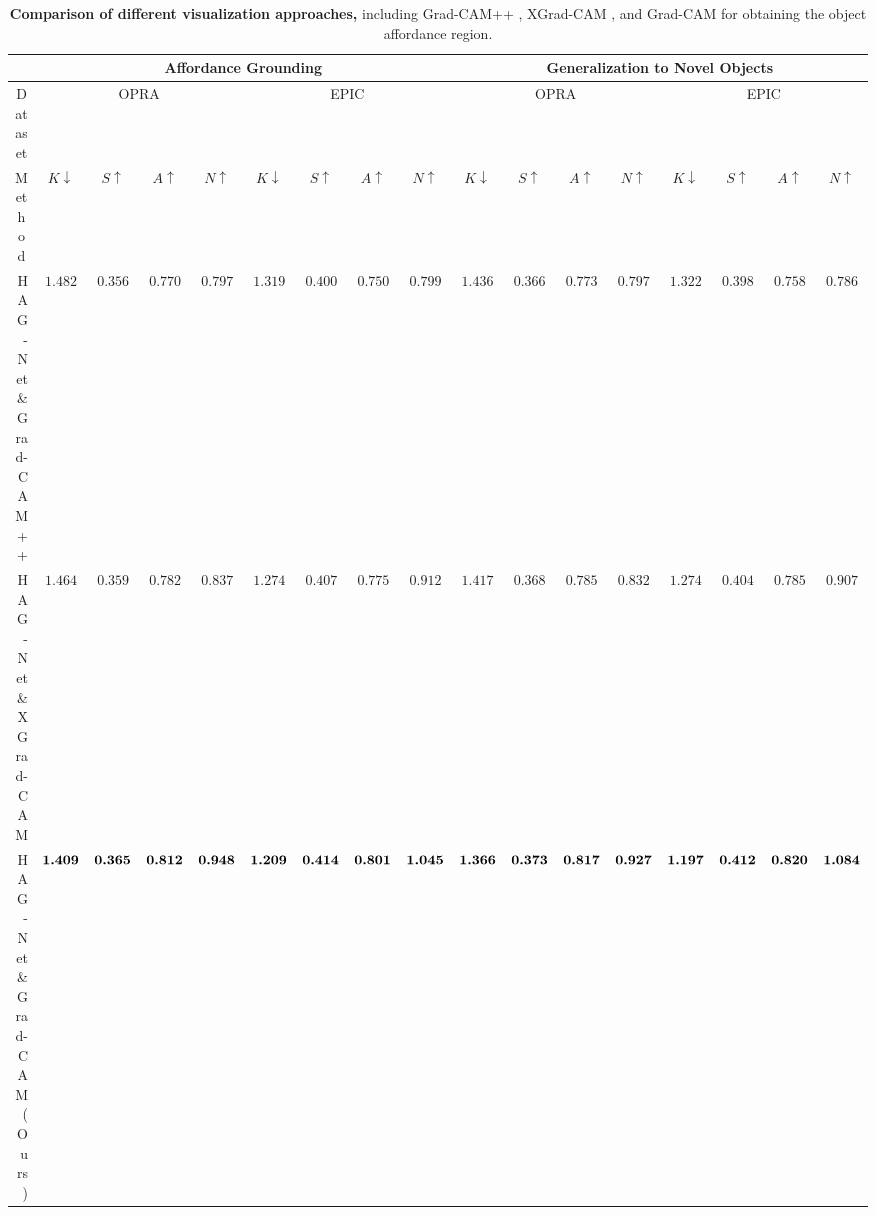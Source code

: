 \documentclass[journal,twoside]{IEEEtran}
\begin{document}
\begin{table*}[t]
\caption{\textbf{Comparison of different visualization approaches,} including Grad-CAM++ \cite{chattopadhay2018grad}, XGrad-CAM \cite{fu2020axiom}, and Grad-CAM \cite{selvaraju2017grad} for obtaining the object affordance region.
}
  \begin{center}
  \small
  \renewcommand{\arraystretch}{1.}
  \renewcommand{\tabcolsep}{1.pt}
  \begin{tabular}{r|cccc|cccc|cccc|cccc}
    \hline\toprule
    \multicolumn{1}{c|}{\quad} & \multicolumn{8}{c|}{\textbf{Affordance Grounding}} & \multicolumn{8}{c}{\textbf{Generalization to Novel Objects}} \\ 
    \hline
    \multicolumn{1}{c|}{Dataset} & \multicolumn{4}{c|}{OPRA \cite{demo2vec2018cvpr}} & \multicolumn{4}{c|}{EPIC \cite{Damen2018EPICKITCHENS}} & \multicolumn{4}{c|}{OPRA \cite{demo2vec2018cvpr}} & \multicolumn{4}{c}{EPIC \cite{Damen2018EPICKITCHENS}}\\ 
    \hline
    \multicolumn{1}{c|}{Method} & \emph{$K\downarrow$} & \emph{$S\uparrow$} & \emph{$A\uparrow$} & \emph{$N\uparrow$} & \emph{$K\downarrow$} & \emph{$S\uparrow$} & \emph{$A\uparrow$} &  \emph{$N\uparrow$} & \emph{$K\downarrow$} & \emph{$S\uparrow$} & \emph{$A\uparrow$} & \emph{$N\uparrow$} & \emph{$K\downarrow$} & \emph{$S\uparrow$} & \emph{$A\uparrow$} & \emph{$N\uparrow$} \\ 
    \hline
   HAG-Net \& Grad-CAM++ \cite{chattopadhay2018grad} & $1.482$ & $0.356$ & $0.770$ & $0.797$  & $1.319$ & $0.400$ & $0.750$ & $0.799$ & $1.436$ & $0.366$ & $0.773$ & $0.797$ & $1.322$ & $0.398$ & $0.758$ & $0.786$ \\
   HAG-Net \& XGrad-CAM \cite{fu2020axiom} & $1.464$ & $0.359$ & $0.782$ & $0.837$  & $1.274$ & $0.407$ & $0.775$ & $0.912$ & $1.417$ & $0.368$  & $0.785$ & $0.832$ & $1.274$ & $0.404$ & $0.785$ & $0.907$ \\
   \hline
   \rowcolor{mygray}
   HAG-Net \& Grad-CAM (Ours) & $\normalsize\textbf{1.409}$ & $\normalsize\textbf{0.365}$ & $\normalsize\textbf{0.812}$ & $\normalsize\textbf{0.948}$ & $\normalsize\textbf{1.209}$ & $\normalsize\textbf{0.414}$ & $\normalsize\textbf{0.801}$ & $\normalsize\textbf{1.045}$ & $\normalsize\textbf{1.366}$ & $\normalsize\textbf{0.373}$ & $\normalsize\textbf{0.817}$ & $\normalsize\textbf{0.927}$ & $\normalsize\textbf{1.197}$ & $\normalsize\textbf{0.412}$ & $\normalsize\textbf{0.820}$ & $\normalsize\textbf{1.084}$    \\
    \hline\bottomrule
    \end{tabular}
    \end{center}
  \label{Table:4}
  \end{table*}
  
\end{document}
